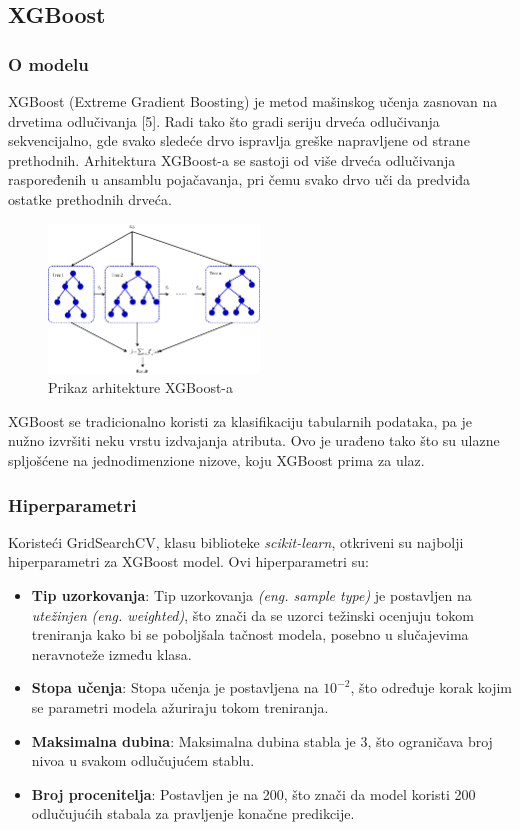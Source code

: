 \documentclass{article}
\begin{document}
\subsection{XGBoost}

\subsubsection{O modelu}
XGBoost (Extreme Gradient Boosting) je metod mašinskog učenja zasnovan na drvetima odlučivanja [5]. Radi tako što gradi seriju drveća odlučivanja sekvencijalno, gde svako sledeće drvo ispravlja greške napravljene od strane prethodnih. Arhitektura XGBoost-a se sastoji od više drveća odlučivanja raspoređenih u ansamblu pojačavanja, pri čemu svako drvo uči da predviđa ostatke prethodnih drveća.
\begin{figure}[H]
    \centering
    \includegraphics[width=0.5\textwidth]{xgboost.png} 
    \caption{Prikaz arhitekture XGBoost-a} 
    \label{arhitektura xgboost-a}
\end{figure}

XGBoost se tradicionalno koristi za klasifikaciju tabularnih podataka, pa je nužno izvršiti neku vrstu izdvajanja atributa. Ovo je urađeno tako što su ulazne spljošćene na jednodimenzione nizove, koju XGBoost prima za ulaz.

\subsubsection{Hiperparametri}

Koristeći GridSearchCV, klasu biblioteke \textit{scikit-learn}, otkriveni su najbolji hiperparametri za XGBoost model. Ovi hiperparametri su:

\begin{itemize}
    \item \textbf{Tip uzorkovanja}: Tip uzorkovanja \textit{(eng. sample type)} je postavljen na \textit{utežinjen} \textit{(eng. weighted)}, 
    što znači da se uzorci težinski ocenjuju tokom treniranja kako bi se poboljšala tačnost modela, posebno u slučajevima neravnoteže između klasa.
    \item \textbf{Stopa učenja}: Stopa učenja je postavljena na $10^{-2}$, što određuje korak kojim se parametri modela ažuriraju tokom treniranja.
    \item \textbf{Maksimalna dubina}: Maksimalna dubina stabla je 3, što ograničava broj nivoa u svakom odlučujućem stablu.
    \item \textbf{Broj procenitelja}: Postavljen je na 200, što znači da model koristi 200 odlučujućih stabala za pravljenje konačne predikcije. 
\end{itemize}
\end{document}
